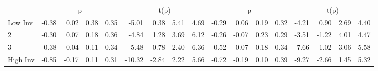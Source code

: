 \begin{table}[!ht]
\begin{tabular}{lrrrrrrrrrrrrrrrr}
  
     & \multicolumn{4}{c}{p} & \multicolumn{4}{c}{t(p)}  & \multicolumn{4}{c}{p} & \multicolumn{4}{c}{t(p)}   \\
     \cmidrule(r){2-5} \cmidrule(r){6-9}  \cmidrule(r){10-13} \cmidrule(r){14-17} 
    Low Inv  & -0.38  & 0.02  & 0.38  & 0.35  & -5.01  & 0.38  & 5.41  & 4.69  & -0.29  & 0.06  & 0.19  & 0.32  & -4.21  & 0.90  & 2.69  & 4.40   \\
    2  & -0.30  & 0.07  & 0.18  & 0.36  & -4.84  & 1.28  & 3.69  & 6.12  & -0.26  & -0.07  & 0.23  & 0.29  & -3.51  & -1.22  & 4.01  & 4.47   \\
    3  & -0.38  & -0.04  & 0.11  & 0.34  & -5.48  & -0.78  & 2.40  & 6.36  & -0.52  & -0.07  & 0.18  & 0.34  & -7.66  & -1.02  & 3.06  & 5.58   \\
    High Inv  & -0.85  & -0.17  & 0.11  & 0.31  & -10.32  & -2.84  & 2.22  & 5.66  & -0.72  & -0.19  & 0.10  & 0.39  & -9.27  & -2.66  & 1.45  & 5.32   \\
    
  
  \bottomrule
\end{tabular}
\label{tbl:32_Size_OP_Inv_B16}
\end{table}